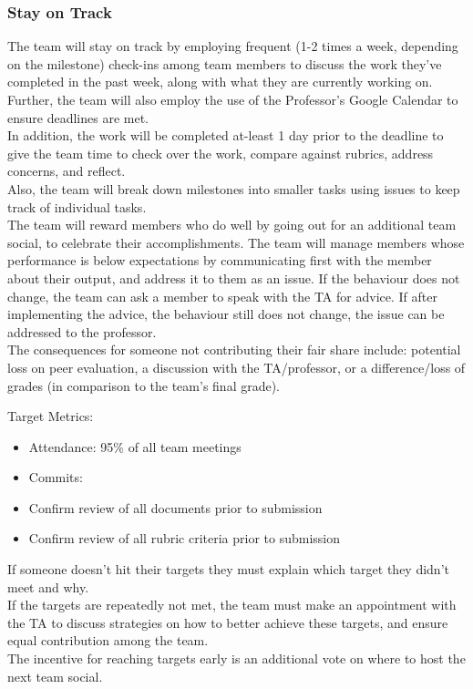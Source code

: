 \documentclass{article}
\begin{document}
\subsubsection*{Stay on Track}

\indent The team will stay on track by employing frequent (1-2 times a week, depending on the milestone)
check-ins among team members to discuss the work they've completed in the past week, along with
what they are currently working on.\\
\indent Further, the team will also employ the use of the Professor's Google Calendar to ensure deadlines are met.\\
\indent In addition, the work will be completed at-least 1 day prior to the deadline to give the team time to check over
the work, compare against rubrics, address concerns, and reflect.\\
\indent Also, the team will break down milestones into smaller tasks using issues to keep track of individual tasks.\\

\indent The team will reward members who do well by going out for an additional team social, to celebrate their accomplishments.
The team will manage members whose performance is below expectations by communicating first with the member
about their output, and address it to them as an issue. If the behaviour does not change, the team can ask a member
to speak with the TA for advice. If after implementing the advice, the behaviour still does not change, the issue can
be addressed to the professor.\\
\indent The consequences for someone not contributing their fair share include: potential loss on peer evaluation, a discussion
with the TA/professor, or a difference/loss of grades (in comparison to the team's final grade).

Target Metrics:
\begin{itemize}
  \item Attendance: 95\% of all team meetings
  \item Commits: 
  \item Confirm review of all documents prior to submission
  \item Confirm review of all rubric criteria prior to submission
\end{itemize}

If someone doesn't hit their targets they must explain which target they didn't meet and why.\\
\indent If the targets are repeatedly not met, the team must make an appointment with the TA to discuss strategies on
how to better achieve these targets, and ensure equal contribution among the team.\\
\indent The incentive for reaching targets early is an additional vote on where to host the next team social.\\
\end{document}
